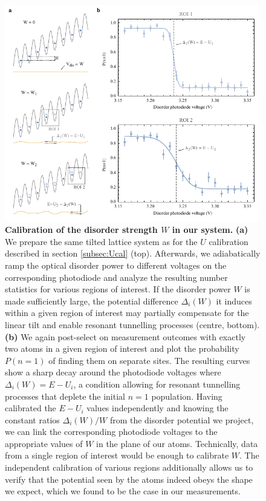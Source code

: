 \begin{figure}[htbp]
	\centering
	\includegraphics{figures/MBL_Wcal.pdf}
	\caption{\label{fig:Wcal} \textbf {Calibration of the disorder strength $W$ in our system.}  \textbf{(a)} We prepare the same tilted lattice system as for the $U$ calibration described in section \ref{subsec:Ucal} (top). Afterwards, we adiabatically ramp the optical disorder power to different voltages on the corresponding photodiode and analyze the resulting number statistics for various regions of interest. If the disorder power $W$ is made sufficiently large, the potential difference $\Delta_i(W)$ it induces within a given region of interest may partially compensate for the linear tilt and enable resonant tunnelling processes (centre, bottom). \textbf{(b)} We again post-select on measurement outcomes with exactly two atoms in a given region of interest and plot the probability $P(n=1)$ of finding them on separate sites. The resulting curves show a sharp decay around the photodiode voltages where $\Delta_i(W) = E-U_i$, a condition allowing for resonant tunnelling processes that deplete the initial $n=1$ population. Having calibrated the $E-U_i$ values independently and knowing the constant ratios $\Delta_i(W)/W$ from the disorder potential we project, we can link the corresponding photodiode voltages to the appropriate values of $W$ in the plane of our atoms. Technically, data from a single region of interest would be enough to calibrate $W$. The independent calibration of various regions additionally allows us to verify that the potential seen by the atoms indeed obeys the shape we expect, which we found to be the case in our measurements.}
\end{figure}


